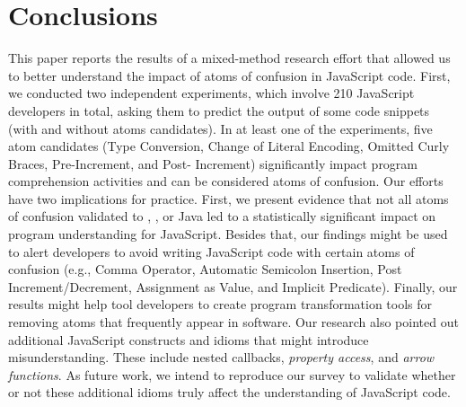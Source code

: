 \section{Conclusions}
\label{conclusion}

This paper reports the results of a mixed-method research effort that allowed us to better understand the impact of atoms of confusion in JavaScript code. First, we conducted two independent experiments, which involve 210 JavaScript developers in total, asking them to predict the output of some code snippets (with and without atoms candidates). In at least one of the experiments, five atom candidates (Type Conversion, Change of Literal Encoding, Omitted Curly Braces, Pre-Increment, and Post- Increment) significantly impact program comprehension activities and can be considered atoms of confusion.
Our efforts have two implications for practice. First, we present evidence that not all atoms of confusion validated to \clang, \cpplang, or Java led to a statistically significant impact on program understanding for JavaScript. Besides that, our findings might be used to alert developers to avoid writing JavaScript code with certain atoms of confusion (e.g., Comma Operator, Automatic Semicolon Insertion, Post Increment/Decrement, Assignment as Value, and Implicit Predicate). Finally, our results might help tool developers to create program transformation tools for removing atoms that frequently appear in software. 
Our research also pointed out additional JavaScript constructs and idioms 
that might introduce misunderstanding. These include nested callbacks, %
\emph{property access}, and \emph{arrow functions}. As future work, we intend to
reproduce our survey to validate whether or not these additional
idioms 
truly affect
the understanding of JavaScript code. 


